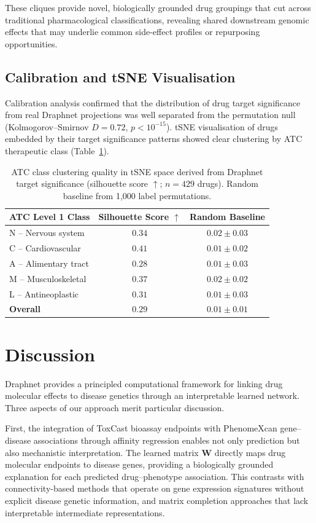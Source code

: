 \documentclass[11pt]{article}
\begin{document}
These cliques provide novel, biologically grounded drug groupings that cut across traditional pharmacological classifications, revealing shared downstream genomic effects that may underlie common side-effect profiles or repurposing opportunities.

\subsection{Calibration and tSNE Visualisation}

Calibration analysis confirmed that the distribution of drug target significance from real Draphnet projections was well separated from the permutation null (Kolmogorov--Smirnov $D = 0.72$, $p < 10^{-15}$). tSNE visualisation of drugs embedded by their target significance patterns showed clear clustering by ATC therapeutic class (Table~\ref{tab:tsne}).

\begin{table}[H]
\centering
\caption{ATC class clustering quality in tSNE space derived from Draphnet target significance (silhouette score $\uparrow$; $n = 429$ drugs). Random baseline from 1,000 label permutations.}
\label{tab:tsne}
\begin{tabular}{lcc}
\toprule
ATC Level 1 Class & Silhouette Score $\uparrow$ & Random Baseline \\
\midrule
N -- Nervous system & $0.34$ & $0.02 \pm 0.03$ \\
C -- Cardiovascular & $0.41$ & $0.01 \pm 0.02$ \\
A -- Alimentary tract & $0.28$ & $0.01 \pm 0.03$ \\
M -- Musculoskeletal & $0.37$ & $0.02 \pm 0.02$ \\
L -- Antineoplastic & $0.31$ & $0.01 \pm 0.03$ \\
\midrule
\textbf{Overall} & $\mathbf{0.29}$ & $0.01 \pm 0.01$ \\
\bottomrule
\end{tabular}
\end{table}

\section{Discussion}

Draphnet provides a principled computational framework for linking drug molecular effects to disease genetics through an interpretable learned network. Three aspects of our approach merit particular discussion.

First, the integration of ToxCast bioassay endpoints with PhenomeXcan gene--disease associations through affinity regression enables not only prediction but also mechanistic interpretation. The learned matrix $\mathbf{W}$ directly maps drug molecular endpoints to disease genes, providing a biologically grounded explanation for each predicted drug--phenotype association. This contrasts with connectivity-based methods \citep{lamb2006connectivity, subramanian2017next} that operate on gene expression signatures without explicit disease genetic information, and matrix completion approaches \citep{natarajan2014inductive} that lack interpretable intermediate representations.
\end{document}
